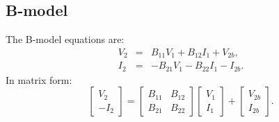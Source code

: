 \documentclass[a4paper, 12pt]{article}
\begin{document}
\subsection{B-model}


The B-model equations are:
%
\begin{eqnarray}
\label{eqn:BV2}
  V_2 & = & B_{11} V_1 + B_{12} I_1 + V_{2b}, \\
  I_2 & = & -B_{21} V_1 - B_{22} I_1 - I_{2b}.
\label{eqn:BI2}
\end{eqnarray}
%
In matrix form:
%
\begin{equation}
  \begin{bmatrix}
    V_2 \\ -I_2
  \end{bmatrix}
  =
  \begin{bmatrix}
    B_{11} & B_{12} \\
    B_{21} & B_{22}
  \end{bmatrix}
  \begin{bmatrix}
    V_1 \\ I_1
  \end{bmatrix}
  +
  \begin{bmatrix}
    V_{2b} \\ I_{2b}
  \end{bmatrix}.
  \label{eqn:Bmat}
\end{equation}
\end{document}
